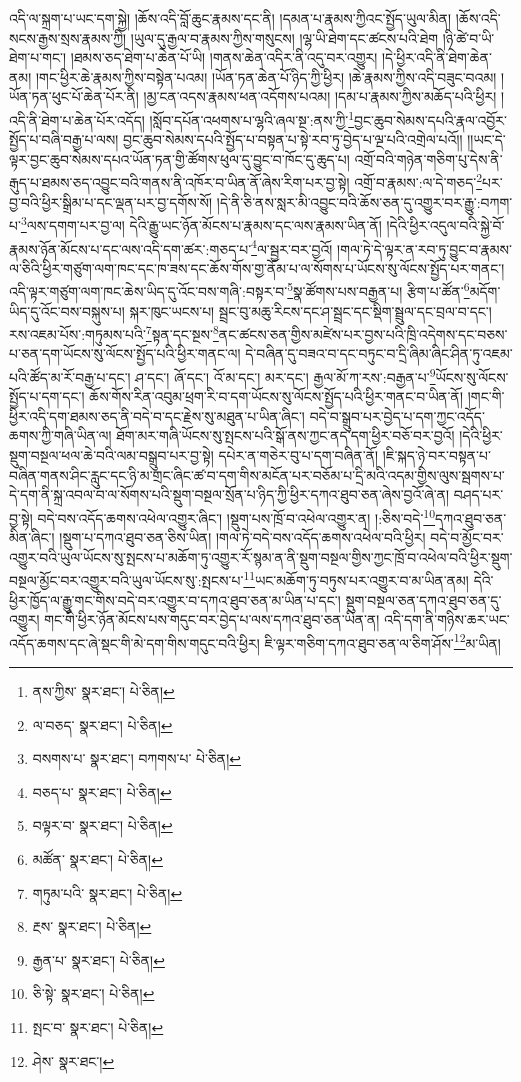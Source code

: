 འདི་ལ་སྐྲག་པ་ཡང་དག་སྐྱེ། །ཆོས་འདི་བློ་ཆུང་རྣམས་དང་ནི། །དམན་པ་རྣམས་ཀྱིའང་སྤྱོད་ཡུལ་མིན། །ཆོས་འདི་སངས་རྒྱས་སྲས་རྣམས་ཀྱི། །ཡུལ་དུ་རྒྱལ་བ་རྣམས་ཀྱིས་གསུངས། །ལྷ་ཡི་ཐེག་དང་ཚངས་པའི་ཐེག །ཉི་ཚེ་བ་ཡི་ཐེག་པ་གང་། །ཐམས་ཅད་ཐེག་པ་ཆེན་པོ་ཡི། །གནས་ཆེན་འདིར་ནི་འདུ་བར་འགྱུར། །དེ་ཕྱིར་འདི་ནི་ཐེག་ཆེན་ནམ། །གང་ཕྱིར་ཆེ་རྣམས་ཀྱིས་བསྟེན་པའམ། །ཡོན་ཏན་ཆེན་པོ་ཉིད་ཀྱི་ཕྱིར། །ཆེ་རྣམས་ཀྱིས་འདི་བཟུང་བའམ། །ཡོན་ཏན་ཕུང་པོ་ཆེན་པོར་ནི། །མྱ་ངན་འདས་རྣམས་ཕན་འདོགས་པའམ། །དམ་པ་རྣམས་ཀྱིས་མཆོད་པའི་ཕྱིར། །འདི་ནི་ཐེག་པ་ཆེན་པོར་འདོད། །སློབ་དཔོན་འཕགས་པ་ལྷའི་ཞལ་སྔ་:ནས་ཀྱི་\footnote{ནས་ཀྱིས་  སྣར་ཐང་།  པེ་ཅིན། }བྱང་ཆུབ་སེམས་དཔའི་རྣལ་འབྱོར་སྤྱོད་པ་བཞི་བརྒྱ་པ་ལས། བྱང་ཆུབ་སེམས་དཔའི་སྤྱོད་པ་བསྟན་པ་སྟེ་རབ་ཏུ་བྱེད་པ་ལྔ་པའི་འགྲེལ་པའོ།། །།ཡང་དེ་ལྟར་བྱང་ཆུབ་སེམས་དཔའ་ཡོན་ཏན་གྱི་ཚོགས་ཕུལ་དུ་བྱུང་བ་ཁོང་དུ་ཆུད་པ། འགྲོ་བའི་གཉེན་གཅིག་པུ་དེས་ནི་རྒུད་པ་ཐམས་ཅད་འབྱུང་བའི་གནས་ནི་འཁོར་བ་ཡིན་ནོ་ཞེས་རིག་པར་བྱ་སྟེ། འགྲོ་བ་རྣམས་:ལ་དེ་གཅད་\footnote{ལ་བཅད་  སྣར་ཐང་།  པེ་ཅིན། }པར་བྱ་བའི་ཕྱིར་སྒྲིམ་པ་དང་ལྡན་པར་བྱ་དགོས་སོ། །དེ་ནི་ཅི་ནས་སླར་མི་འབྱུང་བའི་ཆོས་ཅན་དུ་འགྱུར་བར་རྒྱུ་:བཀག་པ་\footnote{བསགས་པ་  སྣར་ཐང་། བཀགས་པ་  པེ་ཅིན། }ལས་དགག་པར་བྱ་ལ། དེའི་རྒྱུ་ཡང་ཉོན་མོངས་པ་རྣམས་དང་ལས་རྣམས་ཡིན་ནོ། །དེའི་ཕྱིར་འདུལ་བའི་སྐྱེ་བོ་རྣམས་ཉོན་མོངས་པ་དང་ལས་འདི་དག་ཚར་:གཅད་པ་\footnote{བཅད་པ་  སྣར་ཐང་།  པེ་ཅིན། }ལ་སྦྱར་བར་བྱའོ། །གལ་ཏེ་དེ་ལྟར་ན་རབ་ཏུ་བྱུང་བ་རྣམས་ལ་ཅིའི་ཕྱིར་གཙུག་ལག་ཁང་དང་ཁ་ཟས་དང་ཆོས་གོས་གྱ་ནོམ་པ་ལ་སོགས་པ་ཡོངས་སུ་ལོངས་སྤྱོད་པར་གནང་། འདི་ལྟར་གཙུག་ལག་ཁང་ཆེས་ཡིད་དུ་འོང་བས་གཞི་:བསྟར་བ་\footnote{བལྟར་བ་  སྣར་ཐང་།  པེ་ཅིན། }སྣ་ཚོགས་པས་བརྒྱན་པ། རྩིག་པ་ཚོན་\footnote{མཚོན་  སྣར་ཐང་།  པེ་ཅིན། }མདོག་ཡིད་དུ་འོང་བས་བསྐུས་པ། སྐར་ཁུང་ཡངས་པ། སྦྲང་བུ་མཆུ་རིངས་དང་ཤ་སྦྲང་དང་སྡིག་སྦྲུལ་དང་བྲལ་བ་དང་། རས་འཇམ་པོས་:གཏུམས་པའི་\footnote{གཏུམ་པའི་  སྣར་ཐང་།  པེ་ཅིན། }སྟན་དང་སྔས་\footnote{རྔས་  སྣར་ཐང་།  པེ་ཅིན། }ནང་ཚངས་ཅན་གྱིས་མཛེས་པར་བྱས་པའི་ཁྲི་འདེགས་དང་བཅས་པ་ཅན་དག་ཡོངས་སུ་ལོངས་སྤྱོད་པའི་ཕྱིར་གནང་ལ། དེ་བཞིན་དུ་བཟའ་བ་དང་བཏུང་བ་དྲི་ཞིམ་ཞིང་ཤིན་ཏུ་འཇམ་པའི་ཚོད་མ་རོ་བརྒྱ་པ་དང་། ཤ་དང་། ཞོ་དང་། འོ་མ་དང་། མར་དང་། རྒྱལ་མོ་ཀ་རས་:བརྒྱན་པ་\footnote{རྒྱན་པ་  སྣར་ཐང་།  པེ་ཅིན། }ཡོངས་སུ་ལོངས་སྤྱོད་པ་དག་དང་། ཆོས་གོས་རིན་འབུམ་ཕྲག་རི་བ་དག་ཡོངས་སུ་ལོངས་སྤྱོད་པའི་ཕྱིར་གནང་བ་ཡིན་ནོ། །གང་གི་ཕྱིར་འདི་དག་ཐམས་ཅད་ནི་བདེ་བ་དང་རྗེས་སུ་མཐུན་པ་ཡིན་ཞིང་། བདེ་བ་སྒྲུབ་པར་བྱེད་པ་དག་ཀྱང་འདོད་ཆགས་ཀྱི་གཞི་ཡིན་ལ། ཐོག་མར་གཞི་ཡོངས་སུ་སྤངས་པའི་སྒོ་ནས་ཀྱང་ནད་དག་ཕྱིར་བཅོ་བར་བྱའོ། །དེའི་ཕྱིར་སྡུག་བསྔལ་ཕལ་ཆེ་བའི་ལམ་བསྒྲུབ་པར་བྱ་སྟེ། དཔེར་ན་གཅེར་བུ་པ་དག་བཞིན་ནོ། །ཇི་སྐད་ཉེ་བར་བསྟན་པ་བཞིན་གནས་ཤིང་རླུང་དང་ཉི་མ་གྲང་ཞིང་ཚ་བ་དག་གིས་མངོན་པར་བཅོམ་པ་དྲི་མའི་འདམ་གྱིས་ལུས་སྦགས་པ་དེ་དག་ནི་སྐྲ་འབལ་བ་ལ་སོགས་པའི་སྡུག་བསྔལ་སྲོན་པ་ཉིད་ཀྱི་ཕྱིར་དཀའ་ཐུབ་ཅན་ཞེས་བྱའོ་ཞེ་ན། བཤད་པར་བྱ་སྟེ། བདེ་བས་འདོད་ཆགས་འཕེལ་འགྱུར་ཞིང་། །སྡུག་པས་ཁྲོ་བ་འཕེལ་འགྱུར་ན། །:ཅིས་བདེ་\footnote{ཅི་སྟེ་  སྣར་ཐང་།  པེ་ཅིན། }དཀའ་ཐུབ་ཅན་མིན་ཞིང་། །སྡུག་པ་དཀའ་ཐུབ་ཅན་ཅིས་ཡིན། །གལ་ཏེ་བདེ་བས་འདོད་ཆགས་འཕེལ་བའི་ཕྱིར། བདེ་བ་མྱོང་བར་འགྱུར་བའི་ཡུལ་ཡོངས་སུ་སྤངས་པ་མཆོག་ཏུ་འགྱུར་རོ་སྙམ་ན་ནི་སྡུག་བསྔལ་གྱིས་ཀྱང་ཁྲོ་བ་འཕེལ་བའི་ཕྱིར་སྡུག་བསྔལ་མྱོང་བར་འགྱུར་བའི་ཡུལ་ཡོངས་སུ་:སྤངས་པ་\footnote{སྤང་བ་  སྣར་ཐང་།  པེ་ཅིན། }ཡང་མཆོག་ཏུ་བཏུས་པར་འགྱུར་བ་མ་ཡིན་ནམ། དེའི་ཕྱིར་ཁྱོད་ལ་རྒྱུ་གང་གིས་བདེ་བར་འགྱུར་བ་དཀའ་ཐུབ་ཅན་མ་ཡིན་པ་དང་། སྡུག་བསྔལ་ཅན་དཀའ་ཐུབ་ཅན་དུ་འགྱུར། གང་གི་ཕྱིར་ཉོན་མོངས་པས་གདུང་བར་བྱེད་པ་ལས་དཀའ་ཐུབ་ཅན་ཡིན་ན། འདི་དག་ནི་གཉིས་ཆར་ཡང་འདོད་ཆགས་དང་ཞེ་སྡང་གི་མེ་དག་གིས་གདུང་བའི་ཕྱིར། ཇི་ལྟར་གཅིག་དཀའ་ཐུབ་ཅན་ལ་ཅིག་ཤོས་\footnote{ཤེས་  སྣར་ཐང་། }མ་ཡིན། 